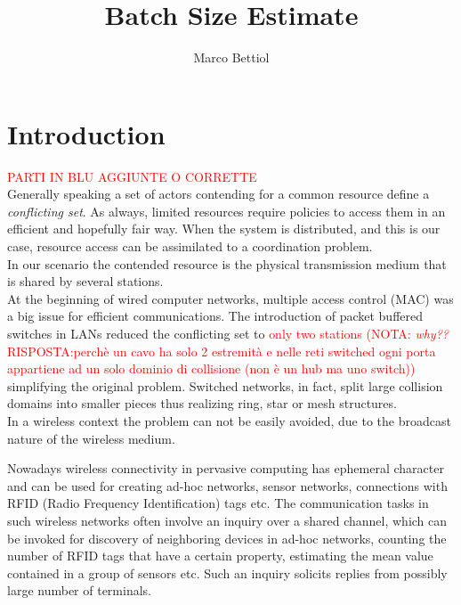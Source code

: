 \documentclass[12pt,a4paper]{report}
\title{Batch Size Estimate}
\author{Marco Bettiol}
\newcommand{\rev}[1]{\textcolor{Cerulean}{#1}}
\begin{document}

\tableofcontents
\listoffigures
\listoftables

\chapter{Introduction}
 
\textcolor{red}{PARTI IN BLU AGGIUNTE O CORRETTE}\\

Generally speaking a set of actors contending for a common resource define a \emph{conflicting set}. As always, limited resources require policies to access them in an efficient and hopefully fair way. When the system is distributed, and this is our case, resource access can be assimilated to a coordination problem.\\ 
\rev{In our scenario the contended resource is the physical transmission medium that is shared by several stations.}\\ \rev{At the beginning of wired computer networks, multiple access control (MAC) was a big issue for efficient communications. The introduction of packet buffered switches  in LANs reduced the conflicting set to \textcolor{red}{only two stations (NOTA: \marginpar{$\leftarrow$ NOTA, OK?}\emph{why??} RISPOSTA:perchè un cavo ha solo 2 estremità e nelle reti switched ogni porta appartiene ad un solo dominio di collisione (non è un hub ma uno switch))}  simplifying  the original problem. Switched networks, in fact, split large collision domains into smaller pieces thus realizing ring, star or mesh structures.\\ 
In a wireless context the problem can not be easily avoided, due to the broadcast nature of the wireless medium.\\  
}

Nowadays wireless connectivity in pervasive computing has ephemeral character and can be used for creating ad-hoc networks, sensor networks, connections with RFID (Radio Frequency Identification) tags etc. The communication tasks in such wireless networks often involve an inquiry over a shared channel, which can be invoked for discovery of neighboring devices in ad-hoc networks, counting the number of RFID tags that have a certain property, estimating the mean value contained in a group of sensors etc. Such an inquiry solicits replies from possibly large number of terminals.\\
\end{document}
